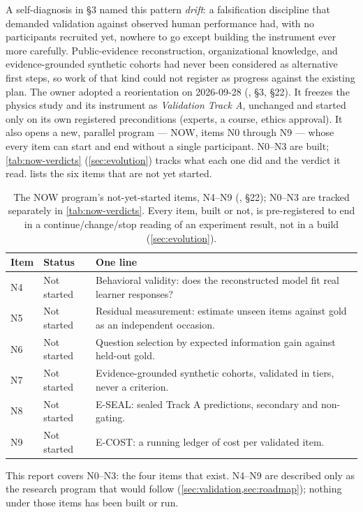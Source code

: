 A self-diagnosis in  \S3 named this pattern \emph{drift}: a
falsification discipline that demanded validation against observed human performance had,
with no participants recruited yet, nowhere to go except building the instrument ever more
carefully. \evint{} Public-evidence reconstruction, organizational knowledge, and
evidence-grounded synthetic cohorts had never been considered as alternative first steps, so
work of that kind could not register as progress against the existing plan. The owner adopted a
reorientation on 2026-09-28 (, \S3, \S22). It freezes the physics study
and its instrument as \emph{Validation Track A}, unchanged and started only on its own registered
preconditions (experts, a course, ethics approval). It also opens a new, parallel program --- NOW,
items N0 through N9 --- whose every item can start and end without a single participant. N0--N3 are
built; \cref{tab:now-verdicts} (\cref{sec:evolution}) tracks what each one did and the verdict it
read.  lists the six items that are not yet started.

\begin{table}[tbp]
  \centering
  \small
  \caption{The NOW program's not-yet-started items, N4--N9 (, \S22); N0--N3
  are tracked separately in \cref{tab:now-verdicts}. Every item, built or not, is pre-registered to
  end in a continue/change/stop reading of an experiment result, not in a build
  (\cref{sec:evolution}).}
  \label{tab:now-items}
  \begin{tabularx}{\linewidth}{@{}llX@{}}
    \toprule
    Item & Status & One line \\
    \midrule
    N4 & Not started & Behavioral validity: does the reconstructed model fit real learner
      responses? \\
    N5 & Not started & Residual measurement: estimate unseen items against gold as an
      independent occasion. \\
    N6 & Not started & Question selection by expected information gain against held-out gold. \\
    N7 & Not started & Evidence-grounded synthetic cohorts, validated in tiers, never a
      criterion. \\
    N8 & Not started & E-SEAL: sealed Track A predictions, secondary and non-gating. \\
    N9 & Not started & E-COST: a running ledger of cost per validated item. \\
    \bottomrule
  \end{tabularx}
\end{table}

This report covers N0--N3: the four items that exist. \evfut{} N4--N9 are described only as the
research program that would follow (\cref{sec:validation,sec:roadmap}); nothing under those
items has been built or run.
